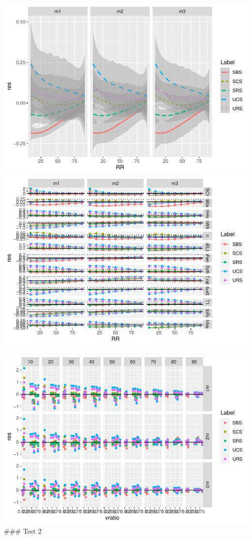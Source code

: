 \documentclass[
  english,
  man,floatsintext]{apa6}
\begin{document}
\includegraphics{5---Analysis_files/figure-latex/unnamed-chunk-27-1.pdf} \includegraphics{5---Analysis_files/figure-latex/unnamed-chunk-27-2.pdf}

\includegraphics{5---Analysis_files/figure-latex/unnamed-chunk-28-1.pdf}
\#\#\# Test 2
\end{document}
